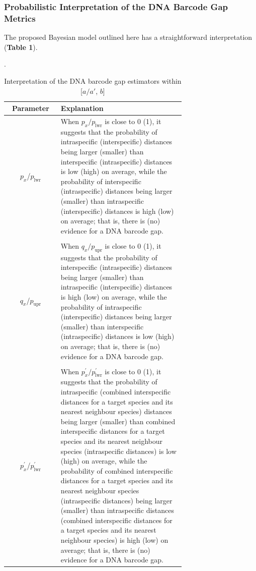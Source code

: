 \documentclass[12pt]{article}
\begin{document}
\subsubsection{Probabilistic Interpretation of the DNA Barcode Gap Metrics}

The proposed Bayesian model outlined here has a straightforward interpretation (\textbf{Table 1}). 

\begin{table}[H]
    \centering
    \small
    \caption{Interpretation of the DNA barcode gap estimators within [$a/a'$, $b$]}.
    \label{tab:parameters}
    \begin{tabular}{cp{0.7\linewidth}}
    \hline
    \textbf{Parameter} & \textbf{Explanation} \\
    \hline
    $p_x$/$p_{\text{lwr}}$ & When $p_x/p_{\text{lwr}}$ is close to 0 (1), it suggests that the probability of intraspecific (interspecific) distances being larger (smaller) than interspecific (intraspecific) distances is low (high) on average, while the probability of interspecific (intraspecific) distances being larger (smaller)  than intraspecific (interspecific) distances is high (low) on average; that is, there is (no) evidence for a DNA barcode gap.\\
        & \\[-2mm]
     $q_x$/$p_{\text{upr}}$ & When $q_x/p_{\text{upr}}$ is close to 0 (1), it suggests that the probability of interspecific (intraspecific) distances being larger (smaller) than intraspecific (interspecific) distances is high (low) on average, while the probability of intraspecific (interspecific) distances being larger (smaller) than interspecific (intraspecific) distances is low (high) on average; that is, there is (no) evidence for a DNA barcode gap. \\
        & \\[-2mm]
    $p^{'}_x$/$p^{'}_{\text{lwr}}$ & When $p^{'}_x/p^{'}_{\text{lwr}}$ is close to 0 (1), it suggests that the probability of intraspecific (combined interspecific distances for a target species and its nearest neighbour species) distances being larger (smaller) than combined interspecific distances for a target species and its nearest neighbour species (intraspecific distances) is low (high) on average, while the probability of combined interspecific distances for a target species and its nearest neighbour species (intraspecific distances) being larger (smaller) than intraspecific distances (combined interspecific distances for a target species and its nearest neighbour species) is high (low) on average; that is, there is (no) evidence for a DNA barcode gap.\\

\end{tabular}
\end{table}
\end{document}
